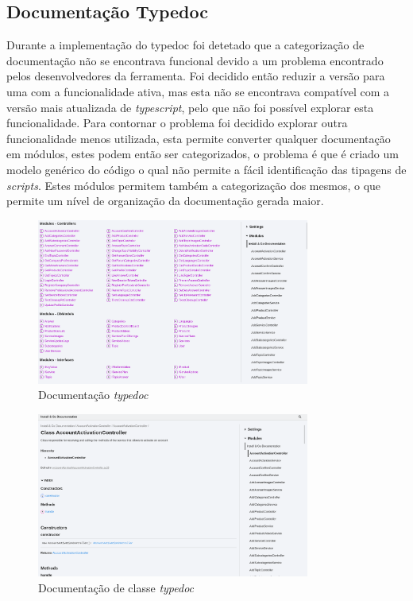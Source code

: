 \subsection{Documentação Typedoc}
Durante a implementação do typedoc foi detetado que a categorização de documentação não se encontrava funcional devido a um problema encontrado pelos desenvolvedores da ferramenta. Foi decidido então reduzir a versão para uma com a funcionalidade ativa, mas esta não se encontrava compatível com a versão mais atualizada de \textit{typescript}, pelo que não foi possível explorar esta funcionalidade. Para contornar o problema foi decidido explorar outra funcionalidade menos utilizada, esta permite converter qualquer documentação em módulos, estes podem então ser categorizados, o problema é que é criado um modelo genérico do código o qual não permite a fácil identificação das tipagens de \textit{scripts}. Estes módulos permitem também a categorização dos mesmos, o que permite um nível de organização da documentação gerada maior.

\begin{figure}[htb]
  \centering
  \includegraphics[width=0.8\textwidth]{images/implementacao/api/docs.png}
  \caption{Documentação \textit{typedoc}}
  \label{type_doc}
\end{figure}

\begin{figure}[htb]
  \centering
  \includegraphics[width=0.8\textwidth]{images/implementacao/api/docs_det.png}
  \caption{Documentação de classe \textit{typedoc}}
  \label{type_doc_det}
\end{figure}

